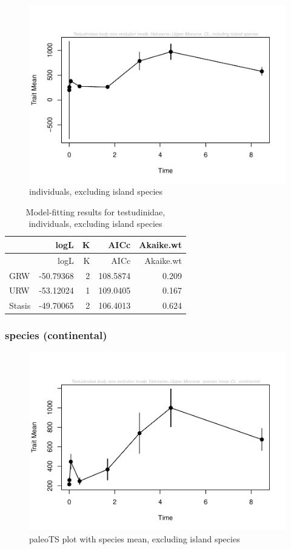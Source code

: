\documentclass[]{article}
\begin{document}
\begin{figure}[htbp]
\centering
\includegraphics{MA_JJ_files/figure-latex/paleoTS, individuals, exluding island species-1.pdf}
\caption{individuals, excluding island species}
\end{figure}

\begin{longtable}[]{@{}lrrrr@{}}
\caption{Model-fitting results for testudinidae, individuals, excluding
island species}\tabularnewline
\toprule
& logL & K & AICc & Akaike.wt\tabularnewline
\midrule
\endfirsthead
\toprule
& logL & K & AICc & Akaike.wt\tabularnewline
\midrule
\endhead
GRW & -50.79368 & 2 & 108.5874 & 0.209\tabularnewline
URW & -53.12024 & 1 & 109.0405 & 0.167\tabularnewline
Stasis & -49.70065 & 2 & 106.4013 & 0.624\tabularnewline
\bottomrule
\end{longtable}

\newpage

\subsubsection{species (continental)}\label{species-continental}

\begin{figure}[htbp]
\centering
\includegraphics{MA_JJ_files/figure-latex/paleoTS plot with species mean, excluding island species-1.pdf}
\caption{paleoTS plot with species mean, excluding island species}
\end{figure}
\end{document}

